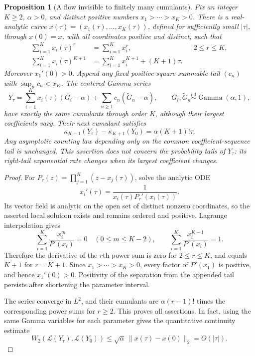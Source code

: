 \documentclass[11pt,letterpaper]{article}
\newtheorem{proposition}[theorem]{Proposition}
\theoremstyle{definition}
\theoremstyle{remark}
\newcommand{\1}{\mathbf 1}
\begin{document}
\begin{proposition}[A flow invisible to finitely many cumulants]
\label{p06:prop:finite-cumulant-invisible-flow}
Fix an integer $K\ge2$, $\alpha>0$, and distinct positive numbers
$x_1>\cdots>x_K>0$.  There is a real-analytic curve
$x(\tau)=(x_1(\tau),\ldots,x_K(\tau))$, defined for sufficiently small
$|\tau|$, through $x(0)=x$, with all coordinates positive and distinct,
such that
\begin{align*}
 \sum_{i=1}^{K}x_i(\tau)^r&=\sum_{i=1}^{K}x_i^r,
       &&2\le r\le K,\\
 \sum_{i=1}^{K}x_i(\tau)^{K+1}
   &=\sum_{i=1}^{K}x_i^{K+1}+(K+1)\tau.
\end{align*}
Moreover $x_1'(0)>0$.  Append any fixed positive square-summable tail
$(c_n)$ with $\sup_n c_n<x_K$.  The centered Gamma series
\[
 Y_\tau=\sum_{i=1}^{K}x_i(\tau)(G_i-\alpha)
             +\sum_{n\ge1}c_n(\widetilde G_n-\alpha),
 \qquad G_i,\widetilde G_n\overset{\mathrm{iid}}{\sim}
             \operatorname{Gamma}(\alpha,1),
\]
have exactly the same cumulants through order $K$, although their largest
coefficients vary.  Their next cumulant satisfies
\[
 \kappa_{K+1}(Y_\tau)-\kappa_{K+1}(Y_0)
        =\alpha(K+1)!\tau.
\]
Any asymptotic counting law depending only on the common
coefficient-sequence tail is unchanged.  This assertion does not concern
the probability tails of $Y_\tau$: its right-tail exponential rate
changes when its largest coefficient changes.
\end{proposition}

\begin{proof}
For $P_\tau(z)=\prod_{j=1}^{K}(z-x_j(\tau))$, solve the analytic ODE
\[
 x_i'(\tau)=\frac{1}{x_i(\tau)P_\tau'(x_i(\tau))}.
\]
Its vector field is analytic on the open set of distinct nonzero
coordinates, so the asserted local solution exists and remains ordered
and positive.  Lagrange interpolation gives
\[
 \sum_{i=1}^{K}\frac{x_i^m}{P'(x_i)}=0\quad(0\le m\le K-2),
 \qquad
 \sum_{i=1}^{K}\frac{x_i^{K-1}}{P'(x_i)}=1.
\]
Therefore the derivative of the $r$th power sum is zero for
$2\le r\le K$, and equals $K+1$ for $r=K+1$.
Since $x_1>\cdots>x_K>0$, every factor of $P'(x_1)$ is positive,
and hence $x_1'(0)>0$.  Positivity of the separation from the appended
tail persists after shortening the parameter interval.

The series converge in $L^2$, and their cumulants are
$\alpha(r-1)!$ times the corresponding power sums for $r\ge2$.
This proves all assertions.  In fact, using the same Gamma variables
for each parameter gives the quantitative continuity estimate
\[
 W_2(\mathcal L(Y_\tau),\mathcal L(Y_0))
 \le\sqrt{\alpha}\,\|x(\tau)-x(0)\|_2=O(|\tau|).
\]
\end{proof}
\end{document}
